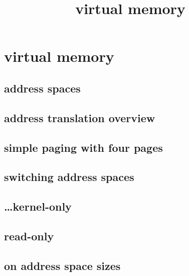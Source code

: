 \graphicspath{{./figures/}}
\title{virtual memory}
\date{}

\begin{frame}
    \titlepage
\end{frame}

\section{virtual memory}

\subsection{address spaces}


\subsection{address translation overview}




\subsection{simple paging with four pages}



\subsection{switching address spaces}



\subsection{\ldots kernel-only}



\subsection{read-only}


\subsection{on address space sizes}

